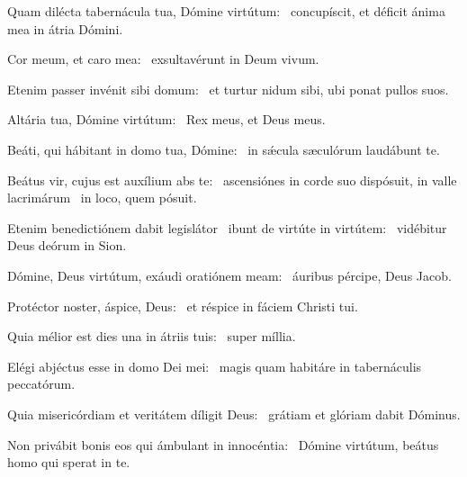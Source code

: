 \item Quam dilécta tabernácula tua, Dómine virtútum:~\psstar{} concupíscit, et déficit ánima mea in átria Dómini.

\item Cor meum, et caro mea:~\psstar{} exsultavérunt in Deum vivum.

\item Etenim passer invénit sibi domum:~\psstar{} et turtur nidum sibi, ubi ponat pullos suos.

\item Altária tua, Dómine virtútum:~\psstar{} Rex meus, et Deus meus.

\item Beáti, qui hábitant in domo tua, Dómine:~\psstar{} in sǽcula sæculórum laudábunt te.

\item Beátus vir, cujus est auxílium abs te:~\pscross{} ascensiónes in corde suo dispósuit, in valle lacrimárum~\psstar{} in loco, quem pósuit.

\item Etenim benedictiónem dabit legislátor~\pscross{} ibunt de virtúte in virtútem:~\psstar{} vidébitur Deus deórum in Sion.

\item Dómine, Deus virtútum, exáudi oratiónem meam:~\psstar{} áuribus pércipe, Deus Jacob.

\item Protéctor noster, áspice, Deus:~\psstar{} et réspice in fáciem Christi tui.

\item Quia mélior est dies una in átriis tuis:~\psstar{} super míllia.

\item Elégi abjéctus esse in domo Dei mei:~\psstar{} magis quam habitáre in tabernáculis peccatórum.

\item Quia misericórdiam et veritátem díligit Deus:~\psstar{} grátiam et glóriam dabit Dóminus.

\item Non privábit bonis eos qui ámbulant in innocéntia:~\psstar{} Dómine virtútum, beátus homo qui sperat in te.
